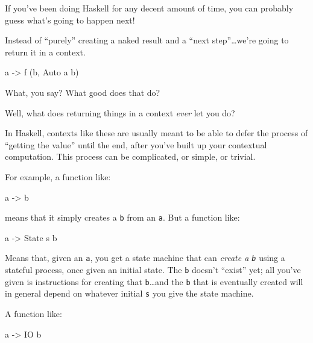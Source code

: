 \documentclass[]{article}
\newenvironment{Shaded}{}{}
\newcommand{\DataTypeTok}[1]{\textcolor[rgb]{0.56,0.13,0.00}{#1}}
\newcommand{\NormalTok}[1]{#1}
\newcommand{\OtherTok}[1]{\textcolor[rgb]{0.00,0.44,0.13}{#1}}
\begin{document}
If you've been doing Haskell for any decent amount of time, you can probably
guess what's going to happen next!

Instead of ``purely'' creating a naked result and a ``next step''\ldots we're
going to return it in a context.

\begin{Shaded}
\begin{Highlighting}[]
\NormalTok{a }\OtherTok{{-}\textgreater{}}\NormalTok{ f (b, }\DataTypeTok{Auto}\NormalTok{ a b)}
\end{Highlighting}
\end{Shaded}

What, you say? What good does that do?

Well, what does returning things in a context \emph{ever} let you do?

In Haskell, contexts like these are usually meant to be able to defer the
process of ``getting the value'' until the end, after you've built up your
contextual computation. This process can be complicated, or simple, or trivial.

For example, a function like:

\begin{Shaded}
\begin{Highlighting}[]
\NormalTok{a }\OtherTok{{-}\textgreater{}}\NormalTok{ b}
\end{Highlighting}
\end{Shaded}

means that it simply creates a \texttt{b} from an \texttt{a}. But a function
like:

\begin{Shaded}
\begin{Highlighting}[]
\NormalTok{a }\OtherTok{{-}\textgreater{}} \DataTypeTok{State}\NormalTok{ s b}
\end{Highlighting}
\end{Shaded}

Means that, given an \texttt{a}, you get a state machine that can \emph{create a
\texttt{b}} using a stateful process, once given an initial state. The
\texttt{b} doesn't ``exist'' yet; all you've given is instructions for creating
that \texttt{b}\ldots and the \texttt{b} that is eventually created will in
general depend on whatever initial \texttt{s} you give the state machine.

A function like:

\begin{Shaded}
\begin{Highlighting}[]
\NormalTok{a }\OtherTok{{-}\textgreater{}} \DataTypeTok{IO}\NormalTok{ b}
\end{Highlighting}
\end{Shaded}
\end{document}
